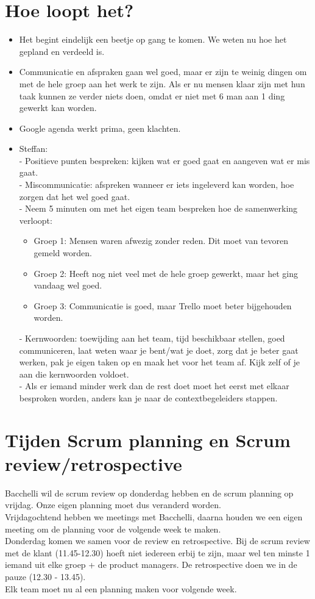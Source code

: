 \documentclass{article}
\begin{document}
\section{Hoe loopt het?}
\begin{itemize}
\item Het begint eindelijk een beetje op gang te komen. We weten nu hoe het gepland en verdeeld is.
\item Communicatie en afspraken gaan wel goed, maar er zijn te weinig dingen om met de hele groep aan het werk te zijn. Als er nu mensen klaar zijn met hun taak kunnen ze verder niets doen, omdat er niet met 6 man aan 1 ding gewerkt kan worden.
\item Google agenda werkt prima, geen klachten.
\item Steffan:\\
- Positieve punten bespreken: kijken wat er goed gaat en aangeven wat er mis gaat.\\
- Miscommunicatie: afspreken wanneer er iets ingeleverd kan worden, hoe zorgen dat het wel goed gaat.\\
- Neem 5 minuten om met het eigen team bespreken hoe de samenwerking verloopt:
\begin{itemize}
\item Groep 1: Mensen waren afwezig zonder reden. Dit moet van tevoren gemeld worden.
\item Groep 2: Heeft nog niet veel met de hele groep gewerkt, maar het ging vandaag wel goed.
\item Groep 3: Communicatie is goed, maar Trello moet beter bijgehouden worden.
\end{itemize}
- Kernwoorden: toewijding aan het team, tijd beschikbaar stellen, goed communiceren, laat weten waar je bent/wat je doet, zorg dat je beter gaat werken, pak je eigen taken op en maak het voor het team af. Kijk zelf of je aan die kernwoorden voldoet.\\
- Als er iemand minder werk dan de rest doet moet het eerst met elkaar besproken worden, anders kan je naar de contextbegeleiders stappen.
\end{itemize}

\section{Tijden Scrum planning en Scrum review/retrospective}
Bacchelli wil de scrum review op donderdag hebben en de scrum planning op vrijdag. Onze eigen planning moet dus veranderd worden.\\
Vrijdagochtend hebben we meetings met Bacchelli, daarna houden we een eigen meeting om de planning voor de volgende week te maken.\\
Donderdag komen we samen voor de review en retrospective. Bij de scrum review met de klant (11.45-12.30) hoeft niet iedereen erbij te zijn, maar wel ten minste 1 iemand uit elke groep + de product managers. De retrospective doen we in de pauze (12.30 - 13.45).\\
Elk team moet nu al een planning maken voor volgende week.
\end{document}
